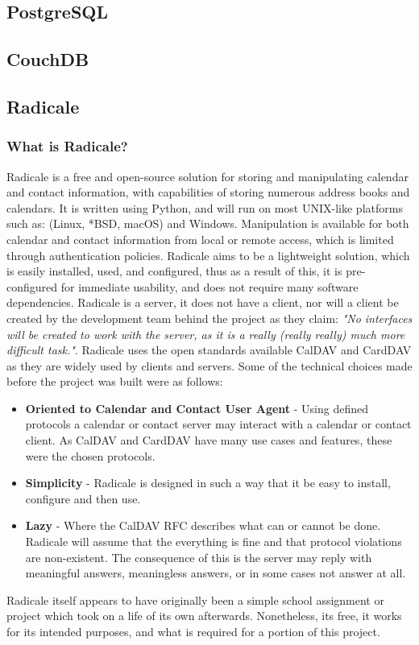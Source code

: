 \subsection{PostgreSQL}
\subsection{CouchDB} %
\subsection{Radicale}
\subsubsection{What is Radicale?}
	Radicale is a free and open-source solution for storing and manipulating calendar and contact information, with capabilities of storing numerous address books and calendars. It is written using Python, and will run on most UNIX-like platforms such as: (Linux, *BSD, macOS) and Windows. Manipulation is available for both calendar and contact information from local or remote access, which is limited through authentication policies. Radicale aims to be a lightweight solution, which is easily installed, used, and configured, thus as a result of this, it is pre-configured for immediate usability, and does not require many software dependencies\cite{kozea}. Radicale is a server, it does not have a client, nor will a client be created by the development team behind the project as they claim: \emph{"No interfaces will be created to work with the server, as it is a really (really really) much more difficult task."}\cite{kozea}. Radicale uses the open standards available CalDAV and CardDAV as they are widely used by clients and servers. Some of the technical choices made before the project was built were as follows:
    \begin{itemize}
    \item \textbf{Oriented to Calendar and Contact User Agent} - Using defined protocols a calendar or contact server may interact with a calendar or contact client. As CalDAV and CardDAV have many use cases and features, these were the chosen protocols.
    \item \textbf{Simplicity} - Radicale is designed in such a way that it be easy to install, configure and then use. 
    \item \textbf{Lazy} - Where the CalDAV RFC describes what can or cannot be done. Radicale will assume that the everything is fine and that protocol violations are non-existent. The consequence of this is the server may reply with meaningful answers, meaningless answers, or in some cases not answer at all.
    \end{itemize}
Radicale itself appears to have originally been a simple school assignment or project which took on a life of its own afterwards.\cite{kozea} Nonetheless, its free, it works for its intended purposes, and what is required for a portion of this project.

